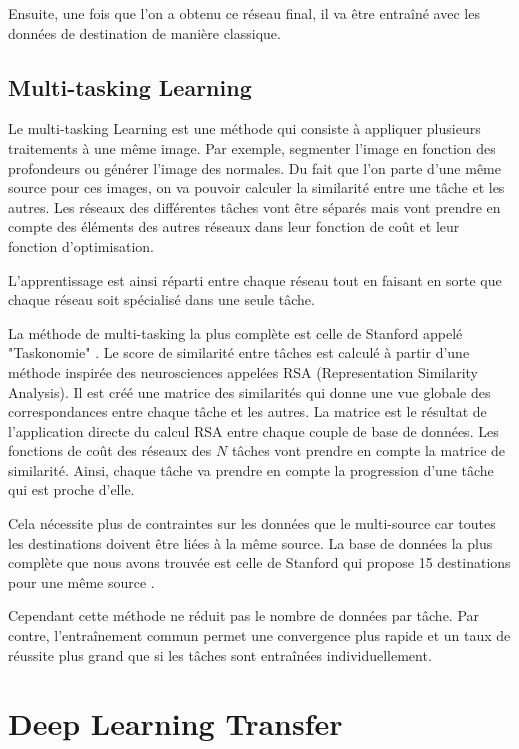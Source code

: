 Ensuite, une fois que l'on a obtenu ce réseau final, il va être entraîné avec les données de destination de manière classique.

\subsection{Multi-tasking Learning}
\label{subsec:multi-tasking}

Le multi-tasking Learning est une méthode qui consiste à appliquer plusieurs traitements à une même image. Par exemple, segmenter l'image en fonction des profondeurs ou générer l'image des normales. Du fait que l'on parte d'une même source pour ces images, on va pouvoir calculer la similarité entre une tâche et les autres. Les réseaux des différentes tâches vont être séparés mais vont prendre en compte des éléments des autres réseaux dans leur fonction de coût et leur fonction d'optimisation.

L'apprentissage est ainsi réparti entre chaque réseau tout en faisant en sorte que chaque réseau soit spécialisé dans une seule tâche.

La méthode de multi-tasking la plus complète est celle de Stanford appelé "Taskonomie" \cite{tasknomie-presentation}. Le score de similarité entre tâches est calculé à partir d'une méthode inspirée des neurosciences appelées RSA (Representation Similarity Analysis). Il est créé une matrice des similarités qui donne une vue globale des correspondances entre chaque tâche et les autres. La matrice est le résultat de l'application directe du calcul RSA entre chaque couple de base de données. Les fonctions de coût des réseaux des $N$ tâches vont prendre en compte la matrice de similarité. Ainsi, chaque tâche va prendre en compte la progression d'une tâche qui est proche d'elle.

Cela nécessite plus de contraintes sur les données que le multi-source car toutes les destinations doivent être liées à la même source. La base de données la plus complète que nous avons trouvée est celle de Stanford qui propose 15 destinations pour une même source \cite{zamir2018taskonomy}.

Cependant cette méthode ne réduit pas le nombre de données par tâche. Par contre, l'entraînement commun permet une convergence plus rapide et un taux de réussite plus grand que si les tâches sont entraînées individuellement.


\section{Deep Learning Transfer}
\label{sec:deepT}

